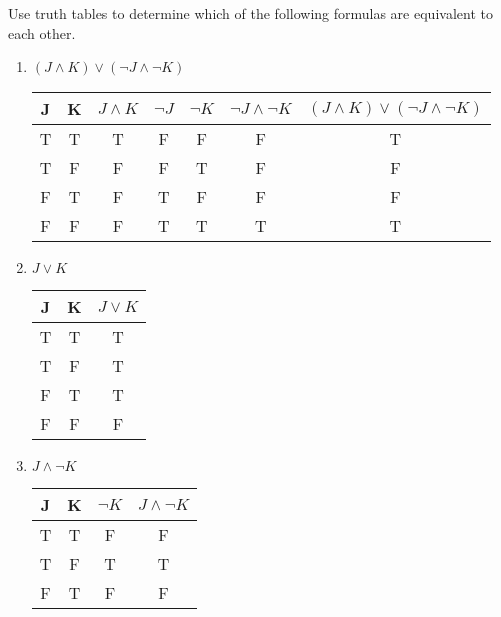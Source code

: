 \begin{prob}
Use truth tables to determine which of the following formulas are equivalent to each other.
\begin{enumerate}
\item $ (J \wedge K) \vee ( \neg J \wedge \neg K) $ \\
\begin{center}
\begin{tabular}{|c|c|c|c|c|c|c|} 
\hline
J & K & $J \wedge K$ & $ \neg J $ & $ \neg K $ & $ \neg J \wedge \neg K $ & $ (J \wedge K) \vee ( \neg J \wedge \neg K) $ \\
\hline
T & T & T            & F          & F          & F                        & T                                             \\
T & F & F            & F          & T          & F                        & F                                             \\
F & T & F            & T          & F          & F                        & F                                             \\
F & F & F            & T          & T          & T                        & T                                            \\
\hline
\end{tabular}
\end{center}
\item $ J \vee K $ \\
\begin{center}
\begin{tabular}{|c|c|c|} 
\hline
J & K & $ J \vee K $ \\
\hline
T & T & T            \\
T & F & T            \\
F & T & T            \\
F & F & F           \\
\hline
\end{tabular}
\end{center}
\item $ J \wedge \neg K$\\
\begin{center}
\begin{tabular}{|c|c|c|c|} 
\hline
J & K & $ \neg K $ & $ J \wedge \neg K $ \\
\hline
T & T & F          & F                   \\
T & F & T          & T                   \\
F & T & F          & F                   \\

\end{tabular}
\end{center}
\end{enumerate}
\end{prob}
